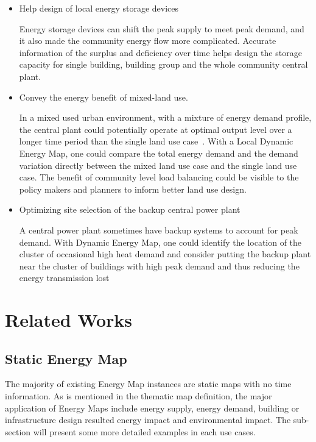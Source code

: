 \documentclass[hidelinks,12pt]{article}
\begin{document}
\begin{itemize}
\item Help design of local energy storage devices

  Energy storage devices can shift the peak supply to meet peak
  demand, and it also made the community energy flow more
  complicated. Accurate information of the surplus and deficiency over
  time helps design the storage capacity for single building, building
  group and the whole community central plant.

\item Convey the energy benefit of mixed-land use.

  In a mixed used urban environment, with a mixture of energy demand
  profile, the central plant could potentially operate at optimal
  output level over a longer time period than the single land use
  case~\cite{IDEA2005}. With a Local Dynamic Energy Map, one could
  compare the total energy demand and the demand variation directly
  between the mixed land use case and the single land use case. The
  benefit of community level load balancing could be visible to the
  policy makers and planners to inform better land use design.
  
\item Optimizing site selection of the backup central power plant

  A central power plant sometimes have backup systems to account for
  peak demand. With Dynamic Energy Map, one could identify the
  location of the cluster of occasional high heat demand and consider
  putting the backup plant near the cluster of buildings with high
  peak demand and thus reducing the energy transmission lost

\end{itemize}

\newpage
\section{Related Works}
\subsection{Static Energy Map}
The majority of existing Energy Map instances are static maps with no
time information. As is mentioned in the thematic map definition, the
major application of Energy Maps include energy supply, energy demand,
building or infrastructure design resulted energy impact and
environmental impact. The sub-section will present some more detailed
examples in each use cases.
\end{document}
